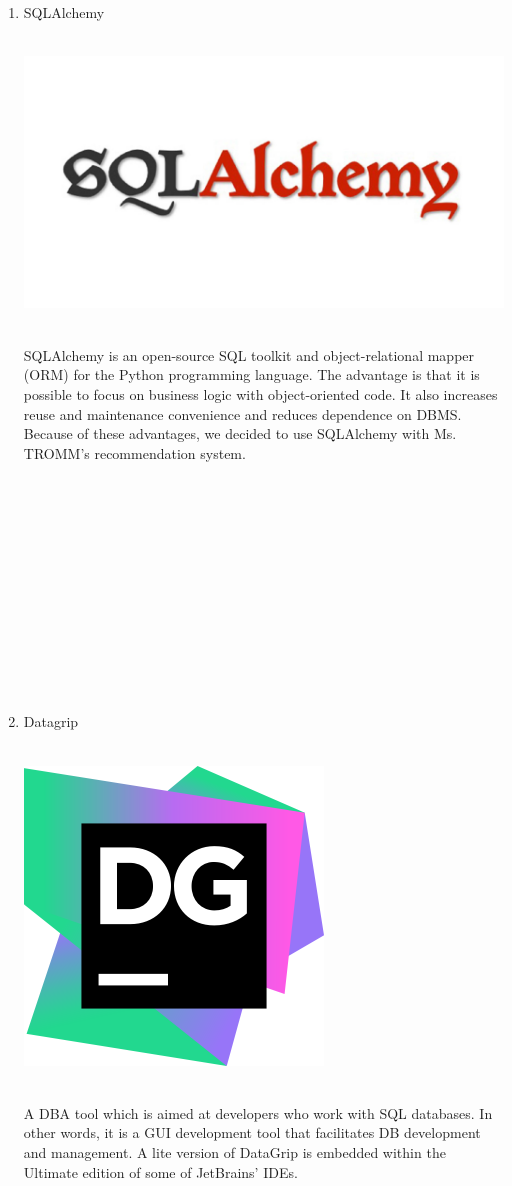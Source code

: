 \documentclass[conference]{IEEEtran}
\begin{document}
\begin{enumerate}
    \item SQLAlchemy \\ \\
    \centerline{\includegraphics[scale=0.27]{assets/sqlalchemy.jpg}}
    \\ SQLAlchemy is an open-source SQL toolkit and object-relational mapper (ORM) for the Python programming language. The advantage is that it is possible to focus on business logic with object-oriented code. It also increases reuse and maintenance convenience and reduces dependence on DBMS. Because of these advantages, we decided to use SQLAlchemy with Ms. TROMM's recommendation system.\\ \\ \\ \\ \\ \\ \\ \\ \\ \\ \\ \\ \ 
    
    \item Datagrip \\ \\
    \centerline{\includegraphics[scale=0.5]{assets/datagrip.png}}
    \\ A DBA tool which is aimed at developers who work with SQL databases. In other words, it is a GUI development tool that facilitates DB development and management. A lite version of DataGrip is embedded within the Ultimate edition of some of JetBrains' IDEs.


\end{enumerate}
\end{document}
